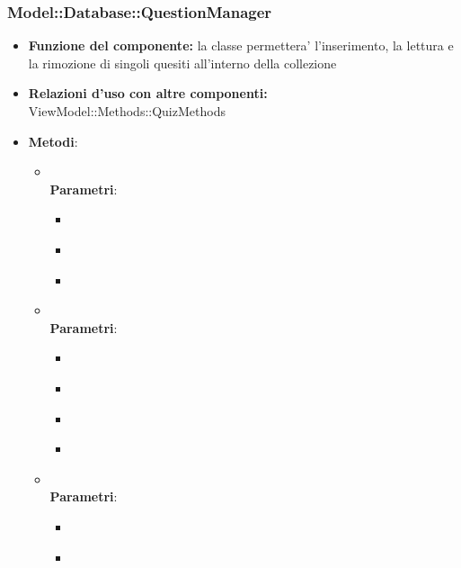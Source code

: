 \subsubsection{Model::Database::QuestionManager}
\begin{itemize}
\item\textbf{Funzione del componente:} la classe permettera' l'inserimento, la lettura e la rimozione di singoli quesiti all'interno della collezione
\item\textbf{Relazioni d'uso con altre componenti:} ViewModel::Methods::QuizMethods\\
\item\textbf{Metodi}:
	\begin{itemize}
		\item{}\\
		\textbf{Parametri}:
			\begin{itemize}
				\item{}\\
				\item{}\\
				\item{}\\
			\end{itemize}
		\item{}\\
		\textbf{Parametri}:
			\begin{itemize}
				\item{}\\
				\item{}\\
				\item{}\\
				\item{}\\
			\end{itemize}
		\item{}\\
		\textbf{Parametri}:
			\begin{itemize}
				\item{}\\
				\item{}\\
			\end{itemize}
	\end{itemize}
\end{itemize}

